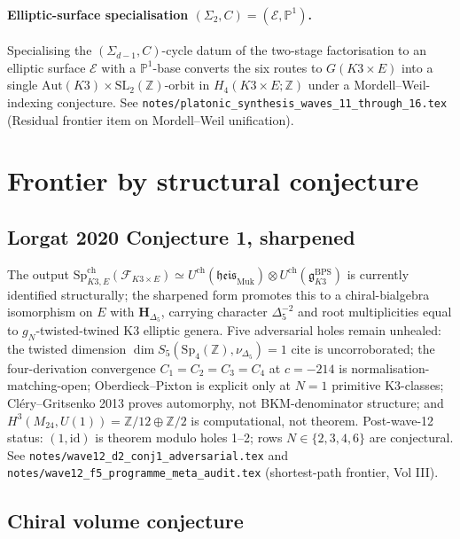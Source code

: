 \documentclass[11pt]{article}
\providecommand{\Z}{\mathbb{Z}}
\providecommand{\Sp}{\mathrm{Sp}}
\providecommand{\fg}{\mathfrak{g}}
\providecommand{\fheis}{\mathfrak{heis}}
\providecommand{\Mtf}{M_{24}}
\begin{document}
\paragraph{Elliptic-surface specialisation $(\Sigma_2, C)
= (\mathcal{E}, \mathbb{P}^1)$.} Specialising the
$(\Sigma_{d-1}, C)$-cycle datum of the two-stage factorisation to an
elliptic surface $\mathcal{E}$ with a $\mathbb{P}^1$-base converts
the six routes to $G(K3 \times E)$ into a single
$\mathrm{Aut}(K3) \times \mathrm{SL}_2(\Z)$-orbit in
$H_4(K3 \times E; \Z)$ under a Mordell--Weil-indexing conjecture.
See \texttt{notes/platonic\_synthesis\_waves\_11\_through\_16.tex}
(Residual frontier item on Mordell--Weil unification).

\section{Frontier by structural conjecture}

\subsection{Lorgat 2020 Conjecture 1, sharpened}

The output $\Sp^{\mathrm{ch}}_{K3, E}(\mathcal{F}_{K3 \times E})
\simeq U^{\mathrm{ch}}(\fheis_{\mathrm{Muk}}) \otimes U^{\mathrm{ch}}(\fg^{\mathrm{BPS}}_{K3})$
is currently identified structurally; the sharpened form promotes
this to a chiral-bialgebra isomorphism on $E$ with
$\mathbf{H}_{\Delta_5}$, carrying character $\Delta_5^{-2}$ and
root multiplicities equal to $g_N$-twisted-twined K3 elliptic
genera. Five adversarial holes remain unhealed: the twisted
dimension $\dim S_5(\Sp_4(\Z), \nu_{\Delta_5}) = 1$ cite is
uncorroborated; the four-derivation convergence $C_1 = C_2 = C_3 = C_4$
at $c = -214$ is normalisation-matching-open; Oberdieck--Pixton is
explicit only at $N = 1$ primitive K3-classes; Cl\'ery--Gritsenko
2013 proves automorphy, not BKM-denominator structure; and
$H^3(\Mtf, U(1)) = \Z/12 \oplus \Z/2$ is computational, not theorem.
Post-wave-12 status: $(1, \mathrm{id})$ is theorem modulo holes 1--2;
rows $N \in \{2, 3, 4, 6\}$ are conjectural. See
\texttt{notes/wave12\_d2\_conj1\_adversarial.tex} and
\texttt{notes/wave12\_f5\_programme\_meta\_audit.tex} (shortest-path
frontier, Vol III).

\subsection{Chiral volume conjecture}
\end{document}
